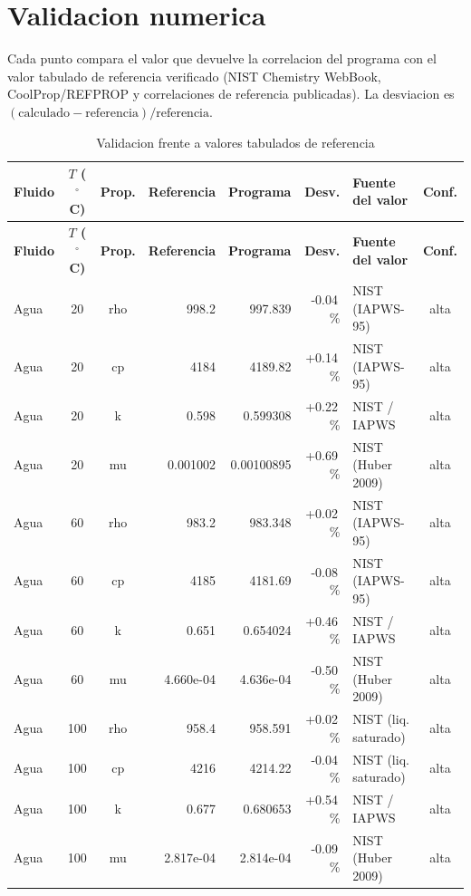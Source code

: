 \documentclass[11pt,a4paper]{article}
\begin{document}
\section{Validacion numerica}
Cada punto compara el valor que devuelve la correlacion del programa con el
valor tabulado de referencia verificado (NIST Chemistry WebBook,
CoolProp/REFPROP y correlaciones de referencia publicadas). La desviacion es
$(\text{calculado} - \text{referencia})/\text{referencia}$.

{\small\setlength{\tabcolsep}{4pt}%
\begin{longtable}{@{}l c c r r r l c@{}}
\caption{Validacion frente a valores tabulados de referencia}\label{tab:val}\\
\toprule
\textbf{Fluido} & \textbf{$T$ ($^\circ$C)} & \textbf{Prop.} &
\textbf{Referencia} & \textbf{Programa} & \textbf{Desv.} &
\textbf{Fuente del valor} & \textbf{Conf.} \\
\midrule
\endfirsthead
\toprule
\textbf{Fluido} & \textbf{$T$ ($^\circ$C)} & \textbf{Prop.} &
\textbf{Referencia} & \textbf{Programa} & \textbf{Desv.} &
\textbf{Fuente del valor} & \textbf{Conf.} \\
\midrule
\endhead
Agua & 20 & rho & 998.2 & 997.839 & -0.04\,\% & NIST (IAPWS-95) & alta \\
Agua & 20 & cp & 4184 & 4189.82 & +0.14\,\% & NIST (IAPWS-95) & alta \\
Agua & 20 & k & 0.598 & 0.599308 & +0.22\,\% & NIST / IAPWS & alta \\
Agua & 20 & mu & 0.001002 & 0.00100895 & +0.69\,\% & NIST (Huber 2009) & alta \\
Agua & 60 & rho & 983.2 & 983.348 & +0.02\,\% & NIST (IAPWS-95) & alta \\
Agua & 60 & cp & 4185 & 4181.69 & -0.08\,\% & NIST (IAPWS-95) & alta \\
Agua & 60 & k & 0.651 & 0.654024 & +0.46\,\% & NIST / IAPWS & alta \\
Agua & 60 & mu & 4.660e-04 & 4.636e-04 & -0.50\,\% & NIST (Huber 2009) & alta \\
Agua & 100 & rho & 958.4 & 958.591 & +0.02\,\% & NIST (liq. saturado) & alta \\
Agua & 100 & cp & 4216 & 4214.22 & -0.04\,\% & NIST (liq. saturado) & alta \\
Agua & 100 & k & 0.677 & 0.680653 & +0.54\,\% & NIST / IAPWS & alta \\
Agua & 100 & mu & 2.817e-04 & 2.814e-04 & -0.09\,\% & NIST (Huber 2009) & alta \\

\end{longtable}}
\end{document}
